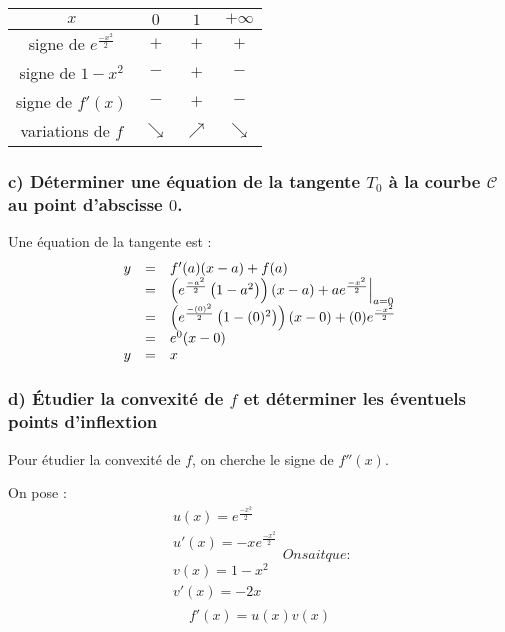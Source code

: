 \documentclass[]{article}
\begin{document}
\begin{longtable}[]{@{}cccc@{}}
\toprule
\(x\) & \(0\) & \(1\) & \(+\infty\)\tabularnewline
\midrule
\endhead
signe de \(e^{\frac{-x^2}{2}}\) & \(+\) & \(+\) & \(+\)\tabularnewline
signe de \(1-x^2\) & \(-\) & \(+\) & \(-\)\tabularnewline
signe de \(f'(x)\) & \(-\) & \(+\) & \(-\)\tabularnewline
variations de \(f\) & \(\searrow\) & \(\nearrow\) &
\(\searrow\)\tabularnewline
\bottomrule
\end{longtable}

\hypertarget{header-n8545}{%
\subsubsection{\texorpdfstring{c) Déterminer une équation de la tangente
\(T_0\) à la courbe \(\mathscr{C}\) au point d'abscisse
\(0\).}{c) Déterminer une équation de la tangente T\_0 à la courbe \textbackslash{}mathscr\{C\} au point d'abscisse 0.}}\label{header-n8545}}

Une équation de la tangente est :
\[
\begin{array}{rll}
        y &=& f'(a)(x-a) + f(a)\\
          &=& \left(e^{\frac{-a^2}{2}}\left(1-a^2\right)\right)(x - a) + ae^{\frac{-x^2}{2}}\Big{|}_{a=0}\\
          &=& \left(e^{\frac{-(0)^2}{2}}\left(1-(0)^2\right)\right)(x - 0) + (0)e^{\frac{-x^2}{2}}\\
          &=& e^{0}(x - 0)\\
        y &=& x
    \end{array}
\]
\hypertarget{header-n8548}{%
\subsubsection{\texorpdfstring{d) Étudier la convexité de \(f\) et
déterminer les éventuels points
d'inflextion}{d) Étudier la convexité de f et déterminer les éventuels points d'inflextion}}\label{header-n8548}}

Pour étudier la convexité de \(f\), on cherche le signe de \(f''(x)\).

On pose :
\[
\begin{array}{c}
        u(x) = e^{\frac{-x^2}{2}}\\
        u'(x) = -xe^{\frac{-x^2}{2}}\\
        \\
        v(x) = 1-x^2\\
        v'(x) = -2x\\
    \end{array}

On sait que :
\]
\[f'(x) = u(x)v(x)\]
\end{document}
